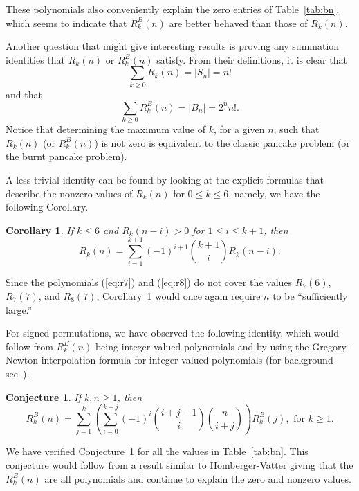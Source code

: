 \documentclass[final]{dmtcs-episciences}
\numberwithin{equation}{section}
\newtheorem{cor}[thm]{Corollary}
\newtheorem{conjecture}[thm]{Conjecture}
\begin{document}

These polynomials also conveniently explain the zero entries of Table~\ref{tab:bn}, which seems to indicate that $R^B_k(n)$ are better behaved than those of $R_k(n)$.

Another question that might give interesting results is proving any summation identities that $R_k(n)$ or $R^B_k(n)$ satisfy. From their definitions, it is clear that
\[
\sum_{k\geq0}R_k(n)=|S_n|=n!
\] and that
\[
\sum_{k\geq0}R^B_k(n)=|B_n|=2^nn!.
\] Notice that determining the maximum value of $k$, for a given $n$, such that $R_k(n)$ (or $R^B_k(n)$) is not zero is equivalent to the classic pancake problem (or the burnt pancake problem). 


A less trivial identity can be found by looking at the explicit formulas that describe the nonzero values of $R_k(n)$ for $0\leq k\leq 6$, namely, we have the following Corollary. 

\begin{cor}\label{cor:sum} 
If $k\leq6$ and $R_k(n-i)>0$ for $1\leq  i\leq k+1$, then
\[
 R_k(n)=\sum_{i=1}^{k+1}(-1)^{i+1}\binom{k+1}{i}R_{k}(n-i).
 \]
 \end{cor}
 
 Since the polynomials (\ref{eq:r7}) and (\ref{eq:r8}) do not cover the values $R_7(6)$, $R_7(7)$, and $R_8(7)$, Corollary~\ref{cor:sum} would once again require $n$ to be ``sufficiently large.''
 
 For signed permutations, we have observed the following identity, which would follow from $R^B_k(n)$ being integer-valued polynomials and by using the Gregory-Newton interpolation formula for integer-valued polynomials (for background see~\cite{CC97}).
 
 \begin{conjecture}\label{con:sum}
 If $k,n\geq1$, then
 \begin{displaymath}R_k^B(n) =\sum_{j=1}^k \left(\sum_{i=0}^{k-j} (-1)^i \binom{i+j-1}{i}\binom{n}{i+j}\right)R_k^B(j), \text{ for } k \geq 1.\end{displaymath}
\end{conjecture} 

We have verified Conjecture~\ref{con:sum} for all the values in Table~\ref{tab:bn}. This conjecture would follow from a result similar to Homberger-Vatter giving that the $R^B_k(n)$ are all polynomials and continue to explain the zero and nonzero values. %
\end{document}
